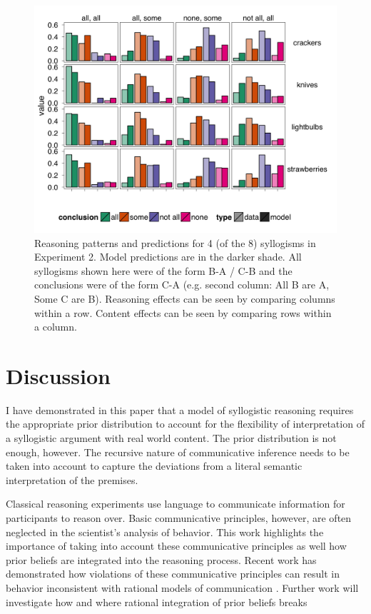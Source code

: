 \documentclass{llncs} %
\begin{document}
\begin{figure}
\centering
    \includegraphics[width=\columnwidth]{figures/syllogismXdomain}
    \caption{Reasoning patterns and predictions for 4 (of the 8) syllogisms in Experiment 2. Model predictions are in the darker shade. All syllogisms shown here were of the form B-A / C-B and the conclusions were of the form C-A (e.g. second column: All B are A, Some C are B). Reasoning effects can be seen by comparing columns within a row. Content effects can be seen by comparing rows within a column.}
  \label{fig:syllogismXdomain}
\end{figure}

\section{Discussion}

I have demonstrated in this paper that a model of syllogistic reasoning requires the appropriate prior distribution to account for the flexibility of interpretation of a syllogistic argument with real world content. The prior distribution is not enough, however. The recursive nature of communicative inference needs to be taken into account to capture the deviations from a literal semantic interpretation of the premises. 

Classical reasoning experiments use language to communicate information for participants to reason over. Basic communicative principles, however, are often neglected in the scientist's analysis of behavior. This work highlights the importance of taking into account these communicative principles as well how prior beliefs are integrated into the reasoning process. Recent work has demonstrated how violations of these communicative principles can result in behavior inconsistent with rational models of communication \cite{Degen2015submitted}. Further work will investigate how and where rational integration of prior beliefs breaks 





\end{document}
